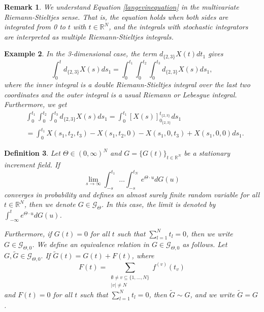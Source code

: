 \documentclass[english, a4paper, 12pt,reqno]{amsart}
\newtheorem{defi}{Definition}[section]
\newtheorem{rem}[defi]{Remark}
\newtheorem{ex}[defi]{Example}
\begin{document}
\begin{rem}
\label{rem:interpretation}
We understand Equation \eqref{langevinequation} in the multivariate Riemann-Stieltjes sense. That is, the equation holds when both sides are integrated from 0 to $t$ with $t\in\mathbb{R}^N$, and the integrals with stochastic integrators are interpreted as multiple Riemann-Stieltjes integrals.
\end{rem}


\begin{ex}
\label{ex:3D}
In the 3-dimensional case, the term $d_{\{2,3\}} X(t) dt_1$ gives
$$\int_0^t d_{\{2,3\}} X(s) ds_1= \int_0^{t_1} \int_0^{t_2} \int_0^{t_3}  d_{\{2,3\}} X(s) ds_1,$$
where the inner integral is a double Riemann-Stieltjes integral over the last two coordinates and the outer integral is a usual Riemann or Lebesgue integral. Furthermore, we get
\begin{equation*}
\begin{split}
&\int_0^{t_1} \int_0^{t_2} \int_0^{t_3}  d_{\{2,3\}} X(s) ds_1 = \int_0^{t_1} [X(s)]_{0_{\{2,3\}}}^{t_{\{2,3\}}} ds_1 \\
&=\int_0^{t_1} X(s_1,t_2,t_3) - X(s_1,t_2,0)- X(s_1,0,t_3) + X(s_1,0,0) ds_1.
\end{split}
\end{equation*}
\end{ex}




\begin{defi}
\label{defi:GH}
Let $\Theta \in (0,\infty)^N$ and $G= \{G(t)\}_{t\in\mathbb{R}^N}$ be a stationary increment field. If
\begin{equation*}
\lim_{s\to\infty} \int_{-s}^{t_1}\dots \int_{-s}^{t_N} e^{\Theta\cdot u} dG(u)
\end{equation*}
converges in probability and defines an almost surely finite random variable for all $t\in\mathbb{R}^N$, then we denote $G\in\mathcal{G}_\Theta$. In this case, the limit is denoted by $\int_{-\infty}^te^{\Theta\cdot u} dG(u)$. 

Furthermore, if $G(t) = 0$ for all $t$ such that $\sum_{l=1}^N t_l = 0$, then we write $G\in \mathcal{G}_{\Theta,0}$. We define an equivalence relation in $G\in \mathcal{G}_{\Theta,0}$ as follows. Let $G, \tilde{G}\in\mathcal{G}_{\Theta,0}.$ If $\tilde{G}(t) = G(t) + F(t)$, where 
\begin{equation*}
F(t) = \sum_{\substack{\emptyset\neq v\subseteq \{1,\dots,N\}\\
|v| \neq N}} f^{(v)}(t_v)
\end{equation*}
and $F(t) = 0$ for all $t$ such that $\sum_{l=1}^N t_l = 0$, then $\tilde{G} \sim G$, and we write $\tilde{G} = G$.
\end{defi}
\end{document}

